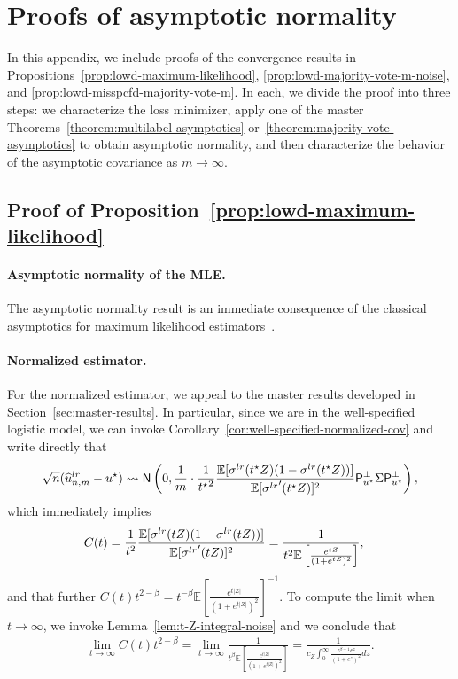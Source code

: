 \documentclass[11pt]{article}
\newcommand{\Ep}{\mathbb{E}}
\newcommand{\E}{\mathbb{E}}
\newcommand{\what}[1]{\widehat{#1}}
\newcommand{\normal}{\mathsf{N}}
\newcommand{\lr}{^{\textup{lr}}}
\newcommand{\proj}{\mathsf{P}}
\newcommand{\projperp}{\proj_{u\opt}^\perp}
\newcommand{\<}{\langle} %
\renewcommand{\>}{\rangle}
\newcommand{\cd}{\rightsquigarrow}
\newcommand{\opt}{^\star}
\begin{document}

\section{Proofs of asymptotic normality}

In this appendix, we include proofs of the convergence results in
Propositions~\ref{prop:lowd-maximum-likelihood},
\ref{prop:lowd-majority-vote-m-noise}, and
\ref{prop:lowd-misspcfd-majority-vote-m}. In each, we divide the proof into
three steps: we characterize the loss minimizer, apply one of the master
Theorems~\ref{theorem:multilabel-asymptotics}
or~\ref{theorem:majority-vote-asymptotics} to obtain asymptotic normality,
and then characterize the behavior of the asymptotic covariance as $m \to
\infty$.

\subsection{Proof of Proposition~\ref{prop:lowd-maximum-likelihood}}
\label{proof:lowd-maximum-likelihood}

\paragraph{Asymptotic normality of the MLE.}
The asymptotic
normality result is an
immediate consequence of the classical asymptotics for maximum likelihood
estimators~\cite[Thm.~5.29]{VanDerVaart98}.


\paragraph{Normalized estimator.}
For the normalized estimator, we appeal to the master results developed in Section~\ref{sec:master-results}.
%
In particular, since we are in the well-specified logistic model, we can invoke Corollary~\ref{cor:well-specified-normalized-cov} and write directly that
\begin{equation*}
	\sqrt{n}(\what{u}_{n,m}\lr- u\opt)
	\cd \normal\left(0, \frac{1}{m} \cdot
	\frac{1}{{t\opt}^2}
	\frac{\E[\sigma\lr(t\opt Z) (1 - \sigma\lr(t\opt Z))]}{\E[{\sigma\lr}'(t\opt Z)]^2}
	\projperp \Sigma \projperp \right),
\end{equation*}
which immediately implies
\begin{align*}
	C(t) & = \frac{1}{t^2}
	\frac{\E[\sigma\lr(t Z) (1 - \sigma\lr(t Z))]}{\E[{\sigma\lr}'(t Z)]^2} = \frac{1}{t^2\Ep\left[\frac{e^{t Z} }{(1 + e^{t Z})^2}\right]},
\end{align*}
and that further $ C(t) {t}^{2 - \beta} = {t}^{-\beta} \Ep[\frac{e^{t|Z|}
  }{(1 + e^{t |Z|})^2}]^{-1}$. To compute the limit when $t \to
\infty$, we invoke Lemma~\ref{lem:t-Z-integral-noise} and
we conclude that
\begin{align*}
  \lim_{t \to \infty} C(t) t^{2 - \beta} = \lim_{t\to \infty}
  \frac{1}{t^\beta \Ep[\frac{e^{t |Z|} }{(1 + e^{t |Z|})^2}]}
  = \frac{1}{ c_Z \int_{0}^{\infty} \frac{z^{\beta - 1} e^{z} }{(1 + e^{z})^2}
    dz}.
\end{align*}
\end{document}
